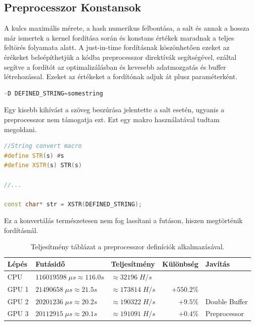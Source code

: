 \subsection{Preprocesszor Konstansok}

A kulcs maximális mérete, a hash numerikus felbontása, a salt és annak a hossza már ismertek a kernel fordítása során és konstans értékek maradnak a teljes feltörés folyamata alatt. A just-in-time fordításnak köszönhetően ezeket az érékeket beleépíthetjük a kódba preprocesszor direktívák segítségével, ezáltal segítve a fordítót az optimalizálásban és kevesebb adatmozgatás és buffer létrehozással. Ezeket az értékeket a fordítónak adjuk át plusz paraméterként.

\begin{lstlisting}[language={C++}]
-D DEFINED_STRING=somestring
\end{lstlisting}

Egy kisebb kihívást a szöveg beszúrása jelentette a salt esetén, ugyanis a preprocesszor nem támogatja ezt. Ezt egy makro használatával tudtam megoldani.

\begin{lstlisting}[language={C++}]
//String convert macro
#define STR(s) #s
#define XSTR(s) STR(s)

//...

const char* str = XSTR(DEFINED_STRING);
\end{lstlisting}

Ez a konvertálás természetesen nem fog lassítani a futáson, hiszen megtörténik fordításnál.


\begin{table}[H]
    \centering
    \begin{tabular}{l|l|l|r|l}
        \textbf{Lépés} & \textbf{Futásidő} & \textbf{Teljesítmény} & \textbf{Különbség} & \textbf{Javítás} \\
        \hline
        \hline
        
        CPU & $\num{116 019 598} \; \mu s \approx \num{116.0}s $ & $\approx \num{32 196} \; H/s$ & & \\
        \hline
                            
        GPU 1 & $\num{21 490 658} \; \mu s \approx \num{21.5}s $ & $\approx \num{173 814} \; H/s$ & $+550.2\%$ & \\
        \hline
        
        GPU 2 & $\num{20 201 236} \; \mu s \approx \num{20.2}s $ & $\approx \num{190 322} \; H/s$ & $+9.5\%$ & Double Buffer \\
        \hline
        
        GPU 3 & $\num{20 112 915} \; \mu s \approx \num{20.1}s $ & $\approx \num{191 091} \; H/s$ & $+0.4\%$ & Preprocessor \\
        \hline
    \end{tabular}
    \caption{Teljesítmény táblázat a preprocesszor definíciók alkalmazásával.}
\end{table}



